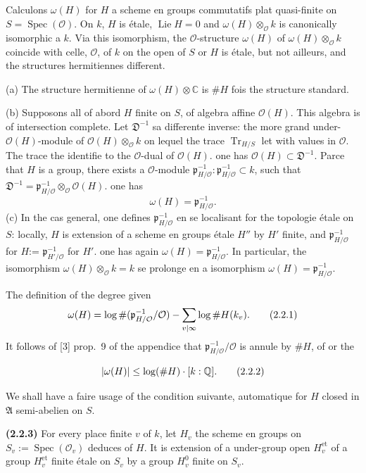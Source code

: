 \documentclass[12pt,a4paper]{article}
\theoremstyle{plain}
\theoremstyle{definition}
\theoremstyle{remark}
\DeclareMathOperator{\Spec}{Spec}
\DeclareMathOperator{\Lie}{Lie}
\DeclareMathOperator{\Tr}{Tr}
\newcommand{\CC}{\mathbb{C}}
\newcommand{\QQ}{\mathbb{Q}}
\newcommand{\cO}{\mathcal{O}}
\newcommand{\fA}{\mathfrak{A}}
\let\deg\relax
\providecommand{\CC}{\mathbb{C}}
\providecommand{\QQ}{\mathbb{Q}}
\providecommand{\cO}{\mathcal{O}}
\providecommand{\fA}{\mathfrak{A}}
\providecommand{\fD}{\mathfrak{D}}
\providecommand{\Spec}{\operatorname{Spec}}
\providecommand{\et}{\mathrm{et}}
\providecommand{\fp}{\mathfrak{p}}
\providecommand{\Lie}{\operatorname{Lie}}
\providecommand{\Tr}{\operatorname{Tr}}
\begin{document}
\subsection{}

Calculons $\omega(H)$ for $H$ a scheme en groups commutatifs plat quasi-finite on $S = \Spec(\cO)$. On $k$, $H$ is étale, $\Lie H = 0$ and $\omega(H) \otimes_{\cO} k$ is canonically isomorphic a $k$. Via this isomorphism, the $\cO$-structure $\omega(H)$ of $\omega(H) \otimes_{\cO} k$ coincide with celle, $\cO$, of $k$ on the open of $S$ or $H$ is étale, but not ailleurs, and the structures hermitiennes different.

(a) The structure hermitienne of $\omega(H) \otimes \CC$ is $\#H$ fois the structure standard.

(b) Supposons all of abord $H$ finite on $S$, of algebra affine $\cO(H)$. This algebra is of intersection complete. Let $\fD^{-1}$ sa differente inverse: the more grand under-$\cO(H)$-module of $\cO(H) \otimes_{\cO} k$ on lequel the trace $\Tr_{H/S}$ let with values in $\cO$. The trace the identifie to the $\cO$-dual of $\cO(H)$. one has $\cO(H) \subset \fD^{-1}$. Parce that $H$ is a group, there exists a $\cO$-module $\fp_{H/\cO}^{-1} : \fp_{H/\cO}^{-1} \subset k$, such that $\fD^{-1} = \fp_{H/\cO}^{-1} \otimes_{\cO} \cO(H)$. one has
\[
\omega(H) = \fp_{H/\cO}^{-1}.
\]
(c) In the cas general, one defines $\fp_{H/\cO}^{-1}$ en se localisant for the topologie étale on $S$: locally, $H$ is extension of a scheme en groups étale $H''$ by $H'$ finite, and $\fp_{H/\cO}^{-1}$ for $H$:= $\fp_{H'/\cO}^{-1}$ for $H'$. one has again $\omega(H) = \fp_{H/\cO}^{-1}$. In particular, the isomorphism $\omega(H) \otimes_{\cO} k = k$ se prolonge en a isomorphism $\omega(H) = \fp_{H/\cO}^{-1}$.

The definition of the degree given
\[
\deg \omega(H) = \log \#(\fp_{H/\cO}^{-1}/\cO) - \sum_{v|\infty} \log \#H(k_v). \tag{2.2.1}
\]
It follows of [3] prop.~9 of the appendice that $\fp_{H/\cO}^{-1}/\cO$ is annule by $\#H$, of or the

\begin{equation}
|\deg \omega(H)| \leq \log(\#H) \cdot [k:\QQ]. \tag{2.2.2}
\end{equation}

We shall have a faire usage of the condition suivante, automatique for $H$ closed in $\fA$ semi-abelien on $S$.

\textbf{(2.2.3)} For every place finite $v$ of $k$, let $H_v$ the scheme en groups on $S_v := \Spec(\cO_v)$ deduces of $H$. It is extension of a under-group open $H_v^{\et}$ of a group $H_v^{\et}$ finite étale on $S_v$ by a group $H_v^0$ finite on $S_v$.
\end{document}
